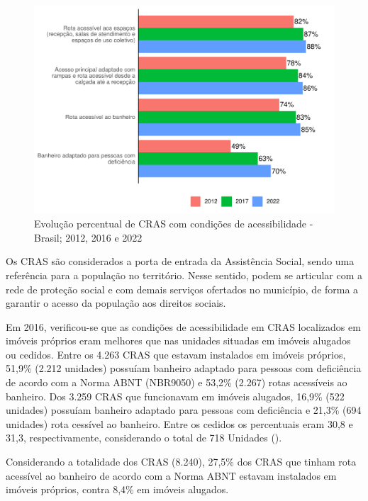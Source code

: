 \documentclass[
  brazilian]{report}
\begin{document}
\begin{figure}
\includegraphics{Censo-SUAS-2022_files/figure-latex/CRAS-acessibilidade-1} \caption[Evolução percentual de CRAS com condições de acessibilidade - Brasil]{Evolução percentual de CRAS com condições de acessibilidade - Brasil; 2012, 2016 e 2022}\label{fig:CRAS-acessibilidade}
\end{figure}

Os CRAS são considerados a porta de entrada da Assistência Social, sendo
uma referência para a população no território. Nesse sentido, podem se
articular com a rede de proteção social e com demais serviços ofertados
no município, de forma a garantir o acesso da população aos direitos
sociais.

Em 2016, verificou-se que as condições de acessibilidade em CRAS
localizados em imóveis próprios eram melhores que nas unidades situadas
em imóveis alugados ou cedidos. Entre os 4.263 CRAS que estavam
instalados em imóveis próprios, 51,9\% (2.212 unidades) possuíam
banheiro adaptado para pessoas com deficiência de acordo com a Norma
ABNT (NBR9050) e 53,2\% (2.267) rotas acessíveis ao banheiro. Dos 3.259
CRAS que funcionavam em imóveis alugados, 16,9\% (522 unidades) possuíam
banheiro adaptado para pessoas com deficiência e 21,3\% (694 unidades)
rota cessível ao banheiro. Entre os cedidos os percentuais eram 30,8 e
31,3, respectivamente, considerando o total de 718 Unidades
().

Considerando a totalidade dos CRAS (8.240), 27,5\% dos CRAS que tinham
rota acessível ao banheiro de acordo com a Norma ABNT estavam instalados
em imóveis próprios, contra 8,4\% em imóveis alugados.
\end{document}
